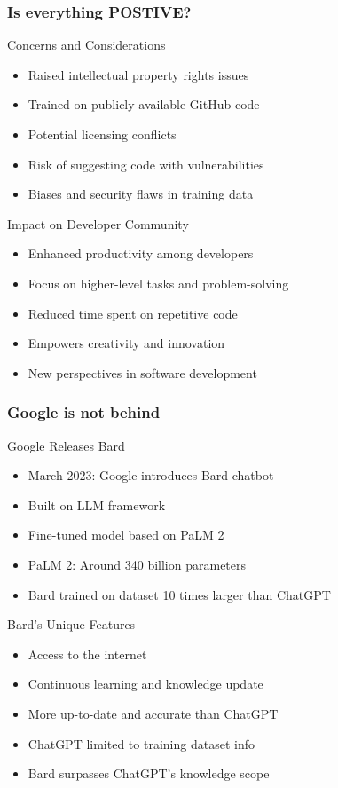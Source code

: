 \begin{frame}[fragile]\frametitle{Is everything POSTIVE?}
    
Concerns and Considerations	
    \begin{itemize}
        \item Raised intellectual property rights issues
        \item Trained on publicly available GitHub code
        \item Potential licensing conflicts
        \item Risk of suggesting code with vulnerabilities
        \item Biases and security flaws in training data
    \end{itemize}

Impact on Developer Community
    
    \begin{itemize}
        \item Enhanced productivity among developers
        \item Focus on higher-level tasks and problem-solving
        \item Reduced time spent on repetitive code
        \item Empowers creativity and innovation
        \item New perspectives in software development
    \end{itemize}
\end{frame}

\begin{frame}[fragile]\frametitle{Google is not behind}
Google Releases Bard
    \begin{itemize}
        \item March 2023: Google introduces Bard chatbot
        \item Built on LLM framework
        \item Fine-tuned model based on PaLM 2
        \item PaLM 2: Around 340 billion parameters
        \item Bard trained on dataset 10 times larger than ChatGPT
    \end{itemize}
Bard's Unique Features
    \begin{itemize}
        \item Access to the internet
        \item Continuous learning and knowledge update
        \item More up-to-date and accurate than ChatGPT
        \item ChatGPT limited to training dataset info
        \item Bard surpasses ChatGPT's knowledge scope
    \end{itemize}
\end{frame}

